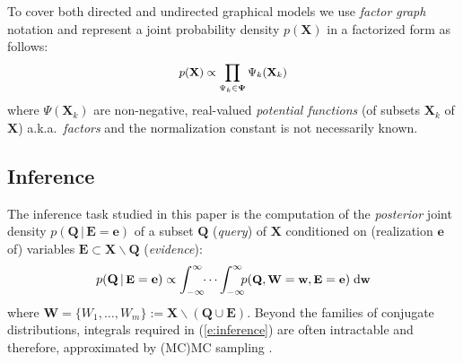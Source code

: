 \documentclass[]{article}
\renewcommand{\vec}[1]{\mathbf{#1}}
\newcommand{\bvec}[1]{\textbf{#1}}
\newcommand{\pr}{p}
\newcommand{\dd}{\;\mathrm{d}} %
\begin{document}
To cover both directed and undirected graphical models we use
\emph{factor graph} notation \citep{kschischang2001factor}
and represent a joint probability density $\pr(\vec{X})$ in a factorized form as follows: 
\begin{equation} \footnotesize
\label{e:factor-graph}
\pr(\vec{X}) \propto \prod_{\Psi_k \in \boldsymbol\Psi} \Psi_k (\vec{X}_k)
\end{equation}
where 
$\Psi(\vec{X}_k)$ are non-negative, real-valued \emph{potential functions} (of subsets $\bvec{X}_k$ of $\vec{X}$) 
a.k.a.\ \emph{factors} and the normalization constant is not necessarily known.

\subsection{Inference}
The inference task studied in this paper is 
the computation of the \emph{posterior} joint density 
$\pr(\bvec{Q} \,|\, \bvec{E}=\bvec{e})$
of 
a subset $\bvec{Q}$ (\emph{query}) of $\bvec{X}$ 
conditioned on (realization $\bvec{e}$ of) 
variables  
$\bvec{E} \subset\bvec{X} \backslash \bvec{Q}$ (\emph{evidence}):
\begin{equation}\vspace{-0.5mm}\footnotesize
\label{e:inference}
\pr(\vec{Q} \,|\, \bvec{E} =\vec{e}) \propto 
\int_{-\infty}^{\infty} \!\! \cdots \int_{-\infty}^{\infty}
\!\!\! \pr(\bvec{Q}, \bvec{W} = \bvec{w}, \bvec{E}=\bvec{e} )
 \dd \bvec{w}
\end{equation}
where $\bvec{W} = \{W_1, \ldots, W_m\} := \vec{X} \backslash (\vec{Q} \cup \vec{E})$. %
Beyond the families of conjugate distributions, integrals required in (\ref{e:inference}) 
are often intractable and therefore, approximated by (MC)MC sampling \citep{koller2009probabilistic}.  

\end{document}
